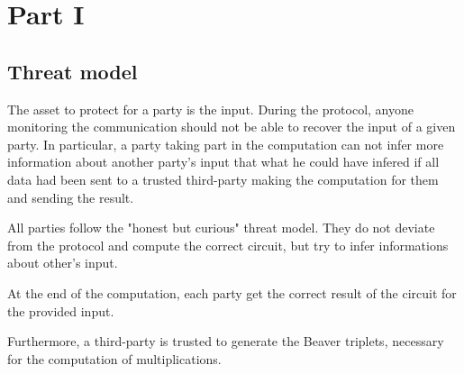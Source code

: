 \documentclass[10pt,conference]{IEEEtran}
\begin{document}
\section{Part I}

\subsection{Threat model}
The asset to protect for a party is the input. During the protocol, anyone monitoring the communication should not be able to recover the input of a given party. In particular, a party taking part in the computation can not infer more information about another party's input that what he could have infered if all data had been sent to a trusted third-party making the computation for them and sending the result.

All parties follow the "honest but curious" threat model. They do not deviate from the protocol and compute the correct circuit, but try to infer informations about other's input.

At the end of the computation, each party get the correct result of the circuit for the provided input.

Furthermore, a third-party is trusted to generate the Beaver triplets, necessary for the computation of multiplications.

\end{document}
